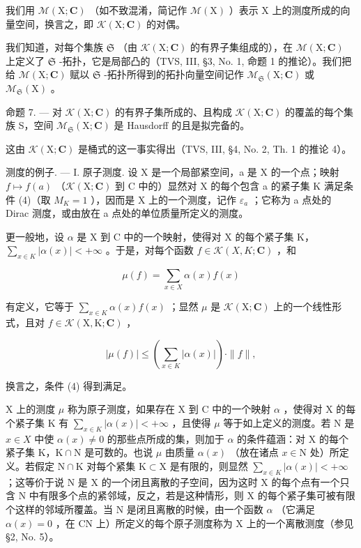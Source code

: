 我们用 \(\mathcal{M}(\mathrm{X};\mathbf{C})\) （如不致混淆，简记作 \(\mathcal{M}(\mathrm{X})\) ）表示 \(\mathrm{X}\) 上的测度所成的向量空间，换言之，即 \(\mathcal{K}(\mathrm{X};\mathbf{C})\) 的对偶。

我们知道，对每个集族 \(\mathfrak{S}\) （由 \(\mathcal{K}(\mathrm{X};\mathbf{C})\) 的有界子集组成的），在 \(\mathcal{M}(\mathrm{X};\mathbf{C})\) 上定义了 \(\mathfrak{S}\) -拓扑，它是局部凸的（TVS, III, §3, No. 1, 命题 1 的推论）。我们把给 \(\mathcal{M}(\mathrm{X};\mathbf{C})\) 赋以 \(\mathfrak{S}\) -拓扑所得到的拓扑向量空间记作 \(\mathcal{M}_{\mathfrak{S}}(\mathrm{X};\mathbf{C})\) 或 \(\mathcal{M}_{\mathfrak{S}}(\mathrm{X})\) 。

命题 7. --- 对 \(\mathcal{K}(\mathrm{X};\mathbf{C})\) 的有界子集所成的、且构成 \(\mathcal{K}(\mathrm{X};\mathbf{C})\) 的覆盖的每个集族 S，空间 \(\mathcal{M}_{\mathfrak{S}}(\mathrm{X};\mathbf{C})\) 是 Hausdorff 的且是拟完备的。

这由 \(\mathcal{K}(\mathrm{X};\mathbf{C})\) 是桶式的这一事实得出（TVS, III, §4, No. 2, Th. 1 的推论 4）。

测度的例子. --- I. 原子测度. 设 X 是一个局部紧空间，a 是 X 的一个点；映射 \(f \mapsto f(a)\) （\(\mathcal{K}(\mathrm{X};\mathbf{C})\) 到 C 中的）显然对 X 的每个包含 a 的紧子集 K 满足条件 (4)（取 \(M_{K} = 1\) ），因而是 X 上的一个测度，记作 \(\varepsilon_{a}\) ；它称为 a 点处的 Dirac 测度，或由放在 a 点处的单位质量所定义的测度。

更一般地，设 \(\alpha\) 是 X 到 C 中的一个映射，使得对 X 的每个紧子集 K，\(\sum_{x\in K}|\alpha(x)|<+\infty\) 。于是，对每个函数 \(f\in\mathcal{K}(X,K;\mathbf{C})\) ，和

\[
\mu (f) = \sum_ {x \in X} \alpha (x) f (x)
\]

有定义，它等于 \(\sum_{x\in K}\alpha (x)f(x)\) ；显然 \(\mu\) 是 \(\mathcal{K}(\mathrm{X};\mathbf{C})\) 上的一个线性形式，且对 \(f\in \mathcal{K}(\mathrm{X},\mathrm{K};\mathbf{C})\) ，

\[
| \mu (f) | \leqslant \left(\sum_ {x \in K} | \alpha (x) |\right) \cdot \| f \|,
\]

换言之，条件 (4) 得到满足。

X 上的测度 \(\mu\) 称为原子测度，如果存在 X 到 C 中的一个映射 \(\alpha\) ，使得对 X 的每个紧子集 K 有 \(\sum_{x\in K}|\alpha (x)| < +\infty\) ，且使得 \(\mu\) 等于如上定义的测度。若 N 是 \(x\in X\) 中使 \(\alpha (x)\neq 0\) 的那些点所成的集，则加于 \(\alpha\) 的条件蕴涵：对 X 的每个紧子集 K，\(\mathrm{K}\cap \mathrm{N}\) 是可数的。也说 \(\mu\) 由质量 \(\alpha (x)\) （放在诸点 \(x\in \mathrm{N}\) 处）所定义。若假定 \(\mathrm{N}\cap \mathrm{K}\) 对每个紧集 \(\mathrm{K}\subset \mathrm{X}\) 是有限的，则显然 \(\sum_{x\in K}|\alpha (x)| < +\infty\) ；这等价于说 N 是 X 的一个闭且离散的子空间，因为这时 X 的每个点有一个只含 N 中有限多个点的紧邻域，反之，若是这种情形，则 X 的每个紧子集可被有限个这样的邻域所覆盖。当 N 是闭且离散的时候，由一个函数 \(\alpha\) （它满足 \(\alpha(x)=0\) ，在 CN 上）所定义的每个原子测度称为 X 上的一个离散测度（参见 §2, No. 5）。

